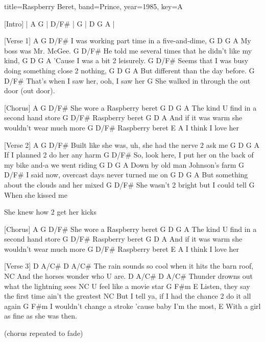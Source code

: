 \documentclass{skrul-leadsheet}
\begin{document}
\begin{song}[transpose-capo=true]{title={Raspberry Beret}, band={Prince}, year={1985}, key={A}}

[Intro]
| A G | D/F# | G | D G A |
 
 
[Verse 1]
      A            G         D/F#
I was working part time in a five-and-dime,
   G                   D G A
My boss was Mr. McGee.
                   G             D/F#
He told me several times that he didn't like my kind,
       G                        D G A
'Cause I was a bit 2 leisurely.
                 G          D/F#
Seems that I was busy doing something close 2 nothing,
    G                               D G A
But different than the day before.
              G        D/F#
That's when I saw her, ooh, I saw her
           G
She walked in through the out door (out door).
 
 
[Chorus]
           A   G           D/F#
She wore a Raspberry beret
    G                  D    G    A
The kind U find in a second hand store
    G           D/F#
Raspberry beret
    G                                D    A
And if it was warm she wouldn't wear much more
    G           D/F#
Raspberry beret
          E    A
I think I love her
 
 
[Verse 2]
A              G                    D/F#
Built like she was, uh, she had the nerve 2 ask me
     G                          D G A
If I planned 2 do her any harm
                                     G                D/F#
So, look here, I put her on the back of my bike and-a we went riding
G                               D G A
Down by old man Johnson's farm
                     G          D/F#
I said now, overcast days never turned me on
    G                                         D G A
But something about the clouds and her mixed
           G            D/F#
She wasn't 2 bright but I could tell
                G
When she kissed me
 
She knew how 2 get her kicks
 
 
[Chorus]
           A   G           D/F#
She wore a Raspberry beret
    G                  D    G    A
The kind U find in a second hand store
    G           D/F#
Raspberry beret
    G                                D    A
And if it was warm she wouldn't wear much more
    G           D/F#
Raspberry beret
          E    A
I think I love her
 
 
[Verse 3]
D        A/C#           D       A/C#
The rain sounds so cool when it hits the barn roof,
NC
And the horses wonder who U are.
D       A/C#                D              A/C#
Thunder drowns out what the lightning sees
  NC
U feel like a movie star
        G        F#m            E
Listen, they say the first time ain't the greatest
               NC
But I tell ya, if I had the chance 2 do it all again
  G                               F#m
I wouldn't change a stroke 'cause baby I'm the most,
       E
With a girl as fine as she was then.
 
 
(chorus repeated to fade)

\end{song}
\end{document}
